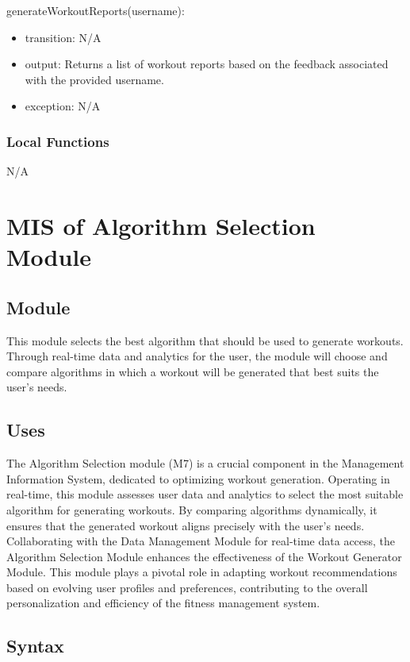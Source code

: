 \documentclass[12pt, titlepage]{article}
\begin{document}
\noindent generateWorkoutReports(username):
\begin{itemize}
\item transition: N/A
\item output: Returns a list of workout reports based on the feedback associated with the provided username.
\item exception: N/A
\end{itemize}


\subsubsection{Local Functions}
N/A

\section{MIS of Algorithm Selection Module}


\subsection{Module}
This module selects the best algorithm that should be used to generate workouts. Through real-time data and analytics for the user, the module will choose and compare algorithms in which a workout will be generated that best suits the user's needs. 

\subsection{Uses}
The Algorithm Selection module (M7) is a crucial component in the Management Information System, dedicated to optimizing workout generation. Operating in real-time, this module assesses user data and analytics to select the most suitable algorithm for generating workouts. By comparing algorithms dynamically, it ensures that the generated workout aligns precisely with the user's needs. Collaborating with the Data Management Module for real-time data access, the Algorithm Selection Module enhances the effectiveness of the Workout Generator Module. This module plays a pivotal role in adapting workout recommendations based on evolving user profiles and preferences, contributing to the overall personalization and efficiency of the fitness management system.

\subsection{Syntax}
\end{document}
